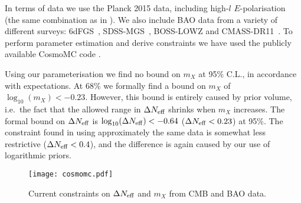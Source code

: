 \documentclass[11pt,a4paper]{article}
\renewcommand\({\left(}
\renewcommand\){\right)}
\renewcommand\[{\left[}
\renewcommand\]{\right]}
\begin{document}
In terms of data we use the Planck 2015 data, including high-$l$ $E$-polarisation \cite{Ade:2015xua,Aghanim:2015xee} (the same combination as in \cite{Archidiacono:2016kkh}).  We also include BAO data from a variety of
different surveys: 6dFGS~\cite{Beutler:2011hx}, SDSS-MGS~\cite{Ross:2014qpa}, BOSS-LOWZ \cite{Anderson:2012sa} and
CMASS-DR11~\cite{Anderson:2013zyy}. To perform parameter estimation and derive constraints we have used
the publicly available CosmoMC code \cite{Lewis:2002ah}.

Using our parameterisation we find no bound on $m_X$ at 95\% C.L., in accordance with expectations. At 68\% we formally find a bound on $m_X$ of $\log_{10}(m_X) < -0.23$. However, this bound is entirely caused by prior volume, i.e.\ the fact that the allowed range in $\Delta N_{\rm eff}$ shrinks when $m_X$ increases.
The formal bound on $\Delta N_{\rm eff}$ is $\log_{10}(\Delta N_{\rm eff}) < -0.64$ ($\Delta N_{\rm eff} < 0.23$) at 95\%. The constraint found in \cite{Archidiacono:2016kkh} using approximately the same data is somewhat less restrictive ($\Delta N_{\rm eff} < 0.4$), and the difference is again caused by our use of logarithmic priors.

 \begin{figure}[t]
\begin{center}
\texttt{[image: cosmomc.pdf]}
\end{center}
\caption{Current constraints on $\Delta N_{\rm eff}$ and $m_X$ from CMB and BAO data.}
   \label{fig:cosmomc}
\end{figure}
\end{document}

